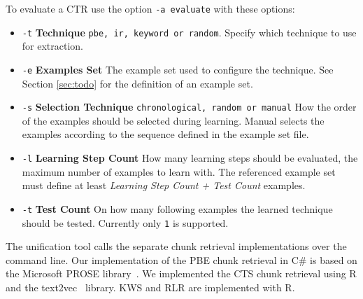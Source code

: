 \documentclass[\myrootdir/main.tex]{subfiles}
\begin{document}
To evaluate a CTR use the option \texttt{-a evaluate} with these options:
\begin{itemize}
    \item \texttt{-t} \textbf{Technique} \texttt{pbe, ir, keyword or random}. Specify which technique to use for extraction.
    \item \texttt{-e} \textbf{Examples Set} The example set used to configure the technique. See Section \ref{sec:todo} for the definition of an example set.
    \item \texttt{-s} \textbf{Selection Technique} \texttt{chronological, random or manual} How the order of the examples should be selected during learning.
    Manual selects the examples according to the sequence defined in the example set file.
    \item \texttt{-l} \textbf{Learning Step Count} How many learning steps should be evaluated, the maximum number of examples to learn with.
    The referenced example set must define at least \emph{Learning Step Count + Test Count} examples.
    \item \texttt{-t} \textbf{Test Count} On how many following examples the learned technique should be tested.
    Currently only \texttt{1} is supported.
\end{itemize}

The unification tool calls the separate chunk retrieval implementations over the command line.
Our implementation of the PBE chunk retrieval in C\# is based on the Microsoft PROSE library~\cite{prose2019webpage}.
We implemented the CTS chunk retrieval using R and the text2vec~\cite{text2vec2019webpage} library.
KWS and RLR are implemented with R.




\end{document}
